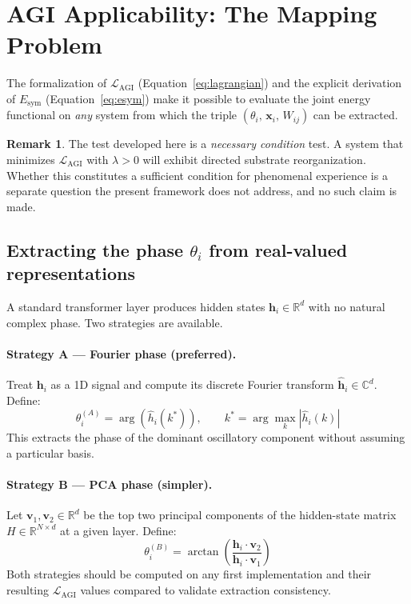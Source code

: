 \documentclass[12pt,a4paper]{article}
\theoremstyle{plain}
\theoremstyle{definition}
\newtheorem{remark}[theorem]{Remark}
\begin{document}
\section{AGI Applicability: The Mapping Problem}
\label{sec:agi_mapping}

The formalization of $\mathcal{L}_{\text{AGI}}$
(Equation~\ref{eq:lagrangian}) and the explicit derivation of
$E_{\text{sym}}$ (Equation~\ref{eq:esym}) make it possible to evaluate
the joint energy functional on \emph{any} system from which the triple
$(\theta_i,\, \mathbf{x}_i,\, W_{ij})$ can be extracted.

\begin{remark}
The test developed here is a \emph{necessary condition} test. A system
that minimizes $\mathcal{L}_{\text{AGI}}$ with $\lambda > 0$ will exhibit
directed substrate reorganization. Whether this constitutes a sufficient
condition for phenomenal experience is a separate question the present
framework does not address, and no such claim is made.
\end{remark}

\subsection{Extracting the phase $\theta_i$ from real-valued
            representations}
\label{subsec:phase_extract}

A standard transformer layer produces hidden states
$\mathbf{h}_i \in \mathbb{R}^d$ with no natural complex phase.
Two strategies are available.

\paragraph{Strategy A --- Fourier phase (preferred).}
Treat $\mathbf{h}_i$ as a 1D signal and compute its discrete Fourier
transform $\hat{\mathbf{h}}_i \in \mathbb{C}^d$. Define:
\begin{equation}
\label{eq:theta_fourier}
\theta_i^{(A)} = \arg\!\left(\hat{h}_i\!\left(k^*\right)\right),
\qquad k^* = \arg\max_k \left|\hat{h}_i(k)\right|
\end{equation}
This extracts the phase of the dominant oscillatory component without
assuming a particular basis.

\paragraph{Strategy B --- PCA phase (simpler).}
Let $\mathbf{v}_1, \mathbf{v}_2 \in \mathbb{R}^d$ be the top two
principal components of the hidden-state matrix
$H \in \mathbb{R}^{N \times d}$ at a given layer. Define:
\begin{equation}
\label{eq:theta_pca}
\theta_i^{(B)} = \arctan\!\left(
  \frac{\mathbf{h}_i \cdot \mathbf{v}_2}
       {\mathbf{h}_i \cdot \mathbf{v}_1}\right)
\end{equation}
Both strategies should be computed on any first implementation and their
resulting $\mathcal{L}_{\text{AGI}}$ values compared to validate
extraction consistency.
\end{document}
